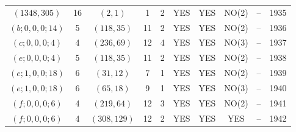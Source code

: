 \begin{longtable}{|c|c|c|c|c|c|c|c|c|c|}
$(1348, 305)$ & 16 & $(2, 1)$ & 1 & 2 & YES & YES & NO(2) & -- & 1935\\
$(b; 0, 0, 0; 14)$ & 5 & $(118, 35)$ & 11 & 2 & YES & YES & NO(2) & -- & 1936\\
$(c; 0, 0, 0; 4)$ & 4 & $(236, 69)$ & 12 & 4 & YES & YES & NO(3) & -- & 1937\\
$(e; 0, 0, 0; 4)$ & 5 & $(118, 35)$ & 11 & 2 & YES & YES & NO(2) & -- & 1938\\
$(e; 1, 0, 0; 18)$ & 6 & $(31, 12)$ & 7 & 1 & YES & YES & NO(2) & -- & 1939\\
$(e; 1, 0, 0; 18)$ & 6 & $(65, 18)$ & 9 & 1 & YES & YES & NO(3) & -- & 1940\\
$(f; 0, 0, 0; 6)$ & 4 & $(219, 64)$ & 12 & 3 & YES & YES & NO(2) & -- & 1941\\
$(f; 0, 0, 0; 6)$ & 4 & $(308, 129)$ & 12 & 2 & YES & YES & YES & -- & 1942
\end{longtable}
